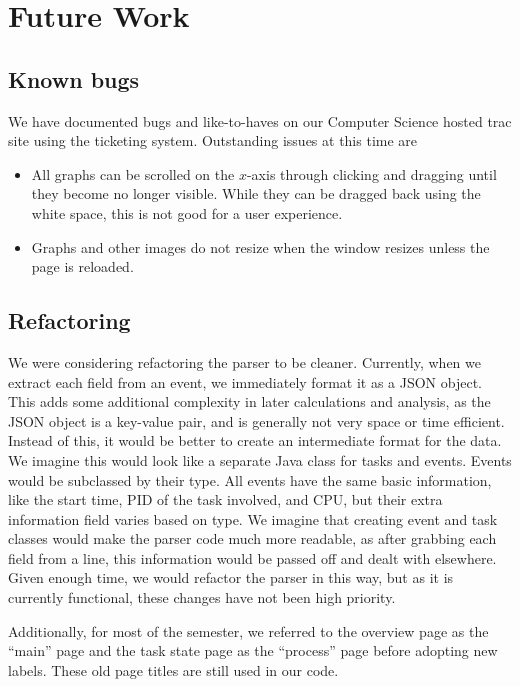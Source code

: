 \documentclass{hmcclinic}
\begin{document}
\chapter{Future Work}
\section{Known bugs}

  We have documented bugs and like-to-haves on our Computer Science hosted trac
  site using the ticketing system. Outstanding issues at this time are

  \begin{itemize}
  
  \item All graphs can be scrolled on the $x$-axis through clicking and dragging until they become no longer visible. While
    they can be dragged back using the white space, this is not good for a user
    experience.

  \item Graphs and other images do not resize when the window resizes unless the
    page is reloaded.

\end{itemize}


  \section{Refactoring}

  We were considering refactoring the parser to be cleaner. Currently, when we
  extract each field from an event, we immediately format it as a JSON object.
  This adds some additional complexity in later calculations and analysis, as
  the JSON object is a key-value pair, and is generally not very space or time
  efficient. Instead of this, it would be better to create an intermediate
  format for the data. We imagine this would look like a separate Java class for
  tasks and events. Events would be subclassed by their type. All events have
  the same basic information, like the start time, PID of the task involved, and
  CPU, but their extra information field varies based on type. We imagine that
  creating event and task classes would make the parser code much more readable,
  as after grabbing each field from a line, this information would be passed off
  and dealt with elsewhere. Given enough time, we would refactor the parser in
  this way, but as it is currently functional, these changes have not been high
  priority.

  Additionally, for most of the semester, we referred to the overview page as the
  ``main'' page and the task state page as the ``process'' page before adopting
  new labels. These old page titles are still used in our code.
\end{document}
